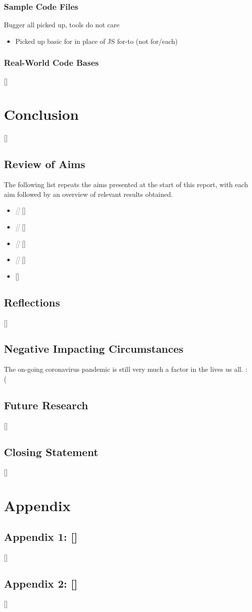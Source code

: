 \documentclass{article}
\begin{document}
        \subsubsection{Sample Code Files}
            Bugger all picked up, tools do not care
            \begin{itemize}
                \item Picked up basic for in place of JS for-to (not for/each)
            \end{itemize}
        \subsubsection{Real-World Code Bases}
            []
\section{Conclusion}
\label{sec:conclusion}
    []
    \subsection{Review of Aims}
        The following list repeats the aims presented at the start of this report, with each aim followed by an overview of relevant results obtained.
        \begin{itemize}
            \item \textcolor{gray}{\textit{[]}}
                []
            \item \textcolor{gray}{\textit{[]}}
                []
            \item \textcolor{gray}{\textit{[]}}
                []
            \item \textcolor{gray}{\textit{[]}}
                []
            \item \textcolor{gray}{\textit{}}
                []
        \end{itemize}
    \subsection{Reflections}
        []
    \subsection{Negative Impacting Circumstances}
        The on-going coronavirus pandemic is still very much a factor in the lives us all. :(
    \subsection{Future Research}
        []
    \subsection{Closing Statement}
        []

\newpage
\section*{Appendix}
    \subsection*{Appendix 1: []}
        []
    \subsection*{Appendix 2: []}
        []
\end{document}
